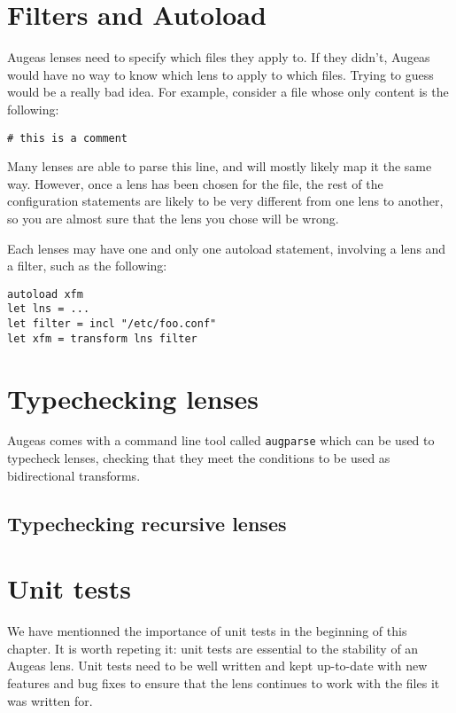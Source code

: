 \section{Filters and Autoload}

Augeas lenses need to specify which files they apply to. If they didn't, Augeas would have no way to know which lens to apply to which files. Trying to guess would be a really bad idea. For example, consider a file whose only content is the following:

\begin{verbatim}
# this is a comment
\end{verbatim}

Many lenses are able to parse this line, and will mostly likely map it the same way. However, once a lens has been chosen for the file, the rest of the configuration statements are likely to be very different from one lens to another, so you are almost sure that the lens you chose will be wrong.

Each lenses may have one and only one autoload statement, involving a lens and a filter, such as the following:

\begin{verbatim}
autoload xfm
let lns = ...
let filter = incl "/etc/foo.conf"
let xfm = transform lns filter
\end{verbatim}


\section{Typechecking lenses}

Augeas comes with a command line tool called \verb!augparse! which can be used to typecheck lenses, checking that they meet the conditions to be used as bidirectional transforms.

\subsection{Typechecking recursive lenses}

\section{Unit tests}

We have mentionned the importance of unit tests in the beginning of this chapter. It is worth repeting it: unit tests are essential to the stability of an Augeas lens. Unit tests need to be well written and kept up-to-date with new features and bug fixes to ensure that the lens continues to work with the files it was written for.

